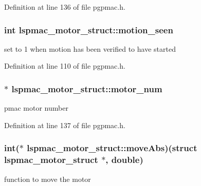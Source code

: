 Definition at line 136 of file pgpmac.\-h.

\hypertarget{structlspmac__motor__struct_a68c471836f52707fa8582f7860cf500f}{
\subsubsection[{motion\-\_\-seen}]{\setlength{\rightskip}{0pt plus 5cm}int lspmac\-\_\-motor\-\_\-struct\-::motion\-\_\-seen}}\label{structlspmac__motor__struct_a68c471836f52707fa8582f7860cf500f}


set to 1 when motion has been verified to have started 



Definition at line 110 of file pgpmac.\-h.

\hypertarget{structlspmac__motor__struct_ad6a51cca3c7e5f79168e5c33fd9e736b}{
\subsubsection[{motor\-\_\-num}]{$\ast$ lspmac\-\_\-motor\-\_\-struct\-::motor\-\_\-num}}\label{structlspmac__motor__struct_ad6a51cca3c7e5f79168e5c33fd9e736b}


pmac motor number 



Definition at line 137 of file pgpmac.\-h.

\hypertarget{structlspmac__motor__struct_a38b6eee046c3ceff84f908af3335ebcf}{
\subsubsection[{move\-Abs}]{\setlength{\rightskip}{0pt plus 5cm}int($\ast$ lspmac\-\_\-motor\-\_\-struct\-::move\-Abs)(struct {\bf lspmac\-\_\-motor\-\_\-struct} $\ast$, double)}}\label{structlspmac__motor__struct_a38b6eee046c3ceff84f908af3335ebcf}


function to move the motor 



